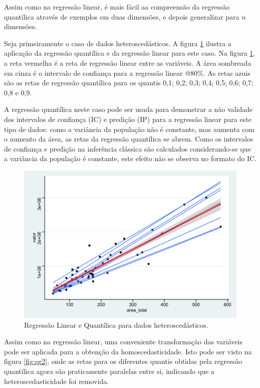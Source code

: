 \documentclass[a4paper, 12pt]{article}
\begin{document}
Assim como na regressão linear, é mais fácil aa compreensão da regressão
quantílica através de exemplos em duas dimensões, e depois generalizar
para \(n\) dimensões.

Seja primeiramente o caso de dados heteroscedásticos. A figura
\ref{fig:qr1} ilustra a aplicação da regressão quantílica e da regressão
linear para este caso. Na figura \ref{fig:qr1}, a reta vermelha é a reta
de regressão linear entre as variáveis. A área sombreada em cinza é o
intervalo de confiança para a regressão linear @80\%. As retas azuis são
as retas de regressão quantílica para os quantis 0,1; 0,2; 0,3; 0,4;
0,5; 0,6; 0,7; 0,8 e 0,9.

A regressão quantílica neste caso pode ser usada para demonstrar a não
validade dos intervalos de confiança (IC) e predição (IP) para a
regressão linear para este tipo de dados: como a variância da população
não é constante, mas aumenta com o aumento da área, as retas da
regressão quantílica se abrem. Como os intervalos de confiança e
predição na inferência clássica são calculados considerando-se que a
variância da população é constante, este efeito não se observa no
formato do IC.

\begin{figure}[H]

{\centering \includegraphics[width=0.7\linewidth]{images/qr1-1} 

}

\caption{Regressão Linear e Quantílica para dados heteroscedásticos.}\label{fig:qr1}
\end{figure}

Assim como na regressão linear, uma conveniente transformação das
variáveis pode ser aplicada para a obtenção da homoscedasticidade. Isto
pode ser visto na figura \ref{fig:qr2}, onde as retas para os diferentes
quantis obtidas pela regressão quantílica agora são praticamente
paralelas entre si, indicando que a heteroscedasticidade foi removida.
\end{document}
